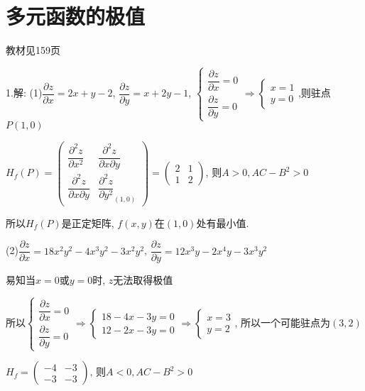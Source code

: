 \section{多元函数的极值}
\begin{flushright}
  \color{zhanqing!80}
   教材见159页
\end{flushright}

  1.解: (1)$\dfrac{{\partial z}}{{\partial x}} = 2x + y - 2$, $\dfrac{{\partial z}}{{\partial y}} = x + 2y - 1$,
  $\begin{cases}\dfrac{{\partial z}}{{\partial x}} =0\\\dfrac{{\partial z}}{{\partial y}} =0\end{cases}\Rightarrow \begin{cases}x=1\\y=0\end{cases}$,则驻点$P(1,0)$

  $H_f(P)=\left( {\begin{array}{*{20}{c}}
    {\dfrac{{\partial^2 z}}{{\partial x^2}}}&{\dfrac{{\partial^2 z}}{{\partial x\partial y}}}\\
    {\dfrac{{\partial^2 z}}{{\partial x\partial y}}}&{\dfrac{{\partial^2 z}}{{\partial y^2}}}_{(1,0)}
    \end{array}} \right) = \left( {\begin{array}{*{20}{c}}
    2&1\\
    1&2
    \end{array}} \right) $,
  则$A>0,AC-B^2>0$

  所以$H_f(P)$是正定矩阵, $f(x,y)$在$(1,0)$处有最小值.

  (2)$\dfrac{{\partial z}}{{\partial x}} = 18x^2y^2 - 4x^3y^2 - 3x^2y^2$,
  $\dfrac{{\partial z}}{{\partial y}} = 12x^3y - 2x^4y - 3x^3y^2$

  易知当$x=0$或$y=0$时, $z$无法取得极值

  所以$\begin{cases}\dfrac{{\partial z}}{{\partial x}}=0\\\dfrac{{\partial z}}{{\partial y}}=0\end{cases} \Rightarrow \begin{cases}18-4x-3y=0\\12-2x-3y=0\end{cases} \Rightarrow\begin{cases}x=3\\y=2\end{cases}$,
  所以一个可能驻点为$(3,2)$

  $H_f = \left( {\begin{array}{*{20}{c}}
    { - 4}&{ - 3}\\
    { - 3}&{ - 3}
    \end{array}} \right)$,
  则$A<0,AC-B^2>0$

